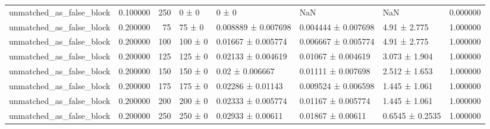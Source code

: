 \begin{tabular}{lrrllllr}
unmatched_as_false_block & 0.100000 & 250 & 0 ± 0 & 0 ± 0 & NaN & NaN & 0.000000 \\
unmatched_as_false_block & 0.200000 & 75 & 75 ± 0 & 0.008889 ± 0.007698 & 0.004444 ± 0.007698 & 4.91 ± 2.775 & 1.000000 \\
unmatched_as_false_block & 0.200000 & 100 & 100 ± 0 & 0.01667 ± 0.005774 & 0.006667 ± 0.005774 & 4.91 ± 2.775 & 1.000000 \\
unmatched_as_false_block & 0.200000 & 125 & 125 ± 0 & 0.02133 ± 0.004619 & 0.01067 ± 0.004619 & 3.073 ± 1.904 & 1.000000 \\
unmatched_as_false_block & 0.200000 & 150 & 150 ± 0 & 0.02 ± 0.006667 & 0.01111 ± 0.007698 & 2.512 ± 1.653 & 1.000000 \\
unmatched_as_false_block & 0.200000 & 175 & 175 ± 0 & 0.02286 ± 0.01143 & 0.009524 ± 0.006598 & 1.445 ± 1.061 & 1.000000 \\
unmatched_as_false_block & 0.200000 & 200 & 200 ± 0 & 0.02333 ± 0.005774 & 0.01167 ± 0.005774 & 1.445 ± 1.061 & 1.000000 \\
unmatched_as_false_block & 0.200000 & 250 & 250 ± 0 & 0.02933 ± 0.00611 & 0.01867 ± 0.00611 & 0.6545 ± 0.2535 & 1.000000 \\
\bottomrule
\end{tabular}
